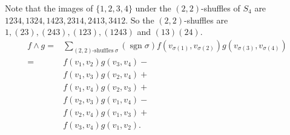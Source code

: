 \begin{solution}
    Note that the images of $\{1,2,3,4\} $ under the  $(2,2)$-shuffles of $S_4$ are $1234,1324,1423,2314,2413,3412$. So the $(2,2)$-shuffles are $1,(23),(243),(123),(1243)$ and $(13)(24)$.
    \begin{align*}
        f\wedge g=&\sum _{(2,2)\text{-shuffles} \ \sigma}(\operatorname{sgn}\sigma)f(v_{\sigma(1)},v_{\sigma(2)})g(v_{\sigma(3)},v_{\sigma(4)})\\
                 =&f(v_1,v_2)g(v_3,v_4)-\\
                 &f(v_1,v_3)g(v_2,v_4)+\\
                 &f(v_1,v_4)g(v_2,v_3)+\\
                 &f(v_2,v_3)g(v_1,v_4)-\\
                 &f(v_2,v_4)g(v_1,v_3)+\\
                 &f(v_3,v_4)g(v_1,v_2).
    \end{align*}
\end{solution}

